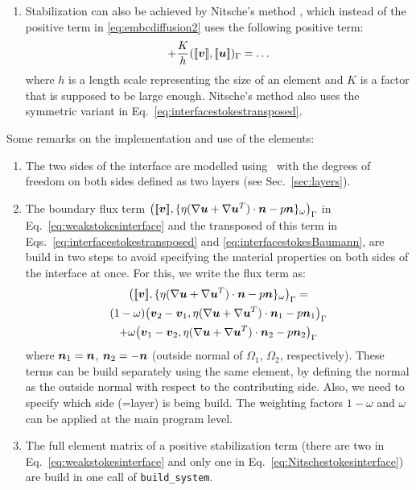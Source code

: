 \begin{enumerate}
\begin{multline}
         \cdot\vec n-p\vec n\}_\omega\big)_{\Gamma}
    -\big(\{\eta(\nabla\vek v+\nabla\vek v^T)
         \cdot\vec n-q\vec n,\lj\vek u\rj\}_\omega\big)_{\Gamma}\\
    \ldots=(\vek v,\vek t_{\text{N}})_{\Gamma_{\text{N}}}+(\vek v,\vek f)
   \label{eq:interfacestokesBaumann}
\end{multline}
The negative sign for the transposed pressure term is optional.
  \item
Stabilization can also be achieved by 
Nitsche's method \cite{Nitsche71}, which instead of the positive term
in \eqref{eq:embcdiffusion2} uses the following positive term:
\begin{equation}
   + \frac{K}{h}(\text{[\![} \boldsymbol{v}\text{]\!]},\text{[\![} \boldsymbol{u}\text{]\!]})_\Gamma = \ldots
   \label{eq:Nitschestokesinterface}
\end{equation}
where $h$ is a length scale representing the size of an element and
$K$ is a factor that is supposed to be large enough. Nitsche's method also
uses the symmetric variant in Eq.~\eqref{eq:interfacestokestransposed}.
\end{enumerate}

Some remarks on the implementation and use of the elements:
\begin{enumerate}
   \item The two sides of the interface are modelled using \xfem\ with the
     degrees of freedom on both sides defined as two layers (see
     Sec.~\ref{sec:layers}).
   \item The boundary flux term 
    $\big(\text{[\![}\boldsymbol{v}\text{]\!]},\{\eta(\nabla\boldsymbol{u}+\nabla\boldsymbol{u}^T)
         \cdot\boldsymbol{n}-p\boldsymbol{n}\}_\omega\big)_{\Gamma}$
in Eq.~\eqref{eq:weakstokesinterface} and
   the transposed of this term in Eqs.~\eqref{eq:interfacestokestransposed}
and \eqref{eq:interfacestokesBaumann}, are build in two steps to avoid
specifying the material properties on both sides of the interface at once.
For this, we write the flux term as:
\begin{multline}
    \big(\text{[\![}\boldsymbol{v}\text{]\!]},\{\eta(\nabla\boldsymbol{u}+\nabla\boldsymbol{u}^T)
         \cdot\boldsymbol{n}-p\boldsymbol{n}\}_\omega\big)_{\Gamma}=\\
    (1-\omega)\big(\boldsymbol{v}_2-\boldsymbol{v}_1,\eta(\nabla\boldsymbol{u}+\nabla\boldsymbol{u}^T)
         \cdot\boldsymbol{n}_1-p\boldsymbol{n}_1\big)_{\Gamma}\\
    +\omega\big(\boldsymbol{v}_1-\boldsymbol{v}_2,\eta(\nabla\boldsymbol{u}+\nabla\boldsymbol{u}^T)
         \cdot\boldsymbol{n}_2-p\boldsymbol{n}_2\big)_{\Gamma}
\end{multline}
where $\boldsymbol{n}_1=\boldsymbol{n}$, $\boldsymbol{n}_2=-\boldsymbol{n}$ (outside normal of $\Omega_1$,
$\Omega_2$, respectively). These terms can be build separately using the same
element, by defining the normal as the outside normal with respect to the
contributing side. Also, we need to specify which side (=layer) is being build.
The weighting factors $1-\omega$ and $\omega$ can be applied at the main
program level.
   \item The full element matrix of a positive stabilization term 
         (there are two in
         Eq.~\eqref{eq:weakstokesinterface} and only one in
          Eq.~\eqref{eq:Nitschestokesinterface}) are build in one call of
         \texttt{build\_system}.
\end{enumerate}

